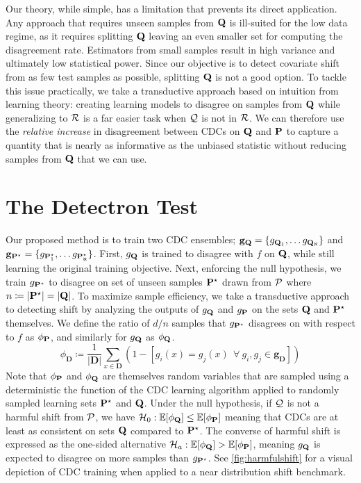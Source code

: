 Our theory, while simple, has a limitation that prevents its direct application.
Any approach that requires unseen samples from $\mathbf{Q}$ is ill-suited for the low data regime, as it requires splitting $\mathbf{Q}$ leaving an even smaller set
for computing the disagreement rate.
Estimators from small samples result in high variance and ultimately low statistical power.
Since our objective is to detect covariate shift from as few test samples as possible, splitting $\mathbf{Q}$ is not a good option.
To tackle this issue practically, we take a transductive approach based on intuition from learning theory: creating learning models to disagree on samples from $\mathbf{Q}$ while generalizing to $\mathcal{R}$ is a far easier task when $\mathcal{Q}$ is not in $\mathcal{R}$.
We can therefore use the \emph{relative increase} in disagreement between CDCs on $\mathbf{Q}$ and $\mathbf{P}$ to capture a quantity that is nearly as informative as the unbiased statistic without reducing samples from $\mathbf{Q}$ that we can use.


\section{The Detectron Test}\label{sec:the-detectron-test}

Our proposed method is to train two CDC ensembles; $\mathbf{g}_{\mathbf{Q}}=\{g_{\mathbf{Q}_1},\ldots {g}_{\mathbf{Q}_\aleph}\}$ and $\mathbf{g}_{\mathbf{P}^\star}=\{g_{\mathbf{P}^\star_1},\ldots g_{\mathbf{P}^\star_\aleph}\}$.
First, $g_{\mathbf{Q}}$ is trained to disagree with $f$ on $\mathbf{Q}$, while still learning the original training objective.
Next, enforcing the null hypothesis, we train $g_{\mathbf{P}^\star}$ to disagree on set of unseen samples $\mathbf{P}^\star$ drawn from $\mathcal{P}$ where $n\coloneqq|\mathbf{P}^\star|=|\mathbf{Q}|$.
To maximize sample efficiency, we take a transductive approach to detecting shift by analyzing the outputs of $g_{\mathbf{Q}}$ and $g_{\mathbf{P}}$ on the sets $\mathbf{Q}$ and $\mathbf{P}^\star$ themselves.
We define the ratio of $d/n$ samples that $g_{\mathbf{P}^\star}$ disagrees on with respect to $f$ as $\phi_{\mathbf{P}}$, and similarly for $g_{\mathbf{Q}}$ as $\phi_{\mathbf{Q}}$.
\begin{equation}
    \phi_{\mathbf{D}} \coloneqq \frac{1}{|\mathbf{D}|} \sum_{x\in \mathbf{D}} (1-[g_i(x) = g_j(x)\ \ \forall\ g_i,g_j \in \mathbf{g}_{\mathbf{D}}])
\end{equation}
Note that $\phi_{\mathbf{P}}$ and $\phi_{\mathbf{Q}}$ are themselves random variables that are sampled using a deterministic the function of the CDC learning algorithm applied to randomly sampled learning sets $\mathbf{P}^\star$ and $\mathbf{Q}$.
Under the null hypothesis, if $\mathcal{Q}$ is not a harmful shift from $\mathcal{P}$, we have $\mathcal{H}_0: \mathbb{E}[\phi_{\mathbf{Q}}] \leq \mathbb{E}[\phi_{\mathbf{P}}]$ meaning that CDCs are at least as consistent on sets $\mathbf{Q}$ compared to $\mathbf{P}^\star$.
The converse of harmful shift is expressed as the one-sided alternative $\mathcal{H}_a: \mathbb{E}[\phi_{\mathbf{Q}}] > \mathbb{E}[\phi_{\mathbf{P}}]$, meaning $g_{\mathbf{Q}}$ is expected to disagree on more samples than $g_{\mathbf{P}^\star}$.
See \autoref{fig:harmfulshift} for a visual depiction of CDC training when applied to a near distribution shift benchmark.

